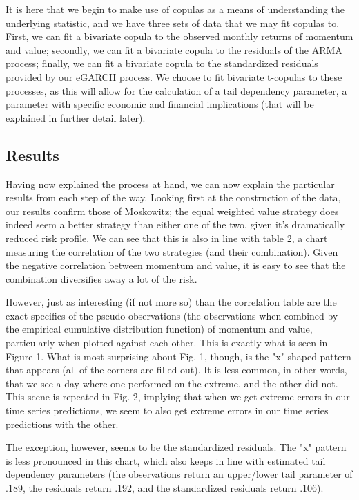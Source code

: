 \documentclass[12pt,letterpaper]{memoir}
\begin{document}
It is here that we begin to make use of copulas as a means of understanding the underlying statistic, and we have three sets of data that we may fit copulas to. First, we can fit a bivariate copula to the observed monthly returns of momentum and value; secondly, we can fit a bivariate copula to the residuals of the ARMA process; finally, we can fit a bivariate copula to the standardized residuals provided by our eGARCH process. We choose to fit bivariate t-copulas to these processes, as this will allow for the calculation of a tail dependency parameter, a parameter with specific economic and financial implications (that will be explained in further detail later).
\subsection*{Results}
Having now explained the process at hand, we can now explain the particular results from each step of the way. Looking first at the construction of the data, our results confirm those of Moskowitz; the equal weighted value strategy does indeed seem a better strategy than either one of the two, given it's dramatically reduced risk profile. We can see that this is also in line with table 2, a chart measuring the correlation of the two strategies (and their combination). Given the negative correlation between momentum and value, it is easy to see that the combination diversifies away a lot of the risk.

However, just as interesting (if not more so) than the correlation table are the exact specifics of the pseudo-observations (the observations when combined by the empirical cumulative distribution function) of momentum and value, particularly when plotted against each other. This is exactly what is seen in Figure 1. What is most surprising about Fig. 1, though, is the "x" shaped pattern that appears (all of the corners are filled out). It is less common, in other words, that we see a day where one performed on the extreme, and the other did not. This scene is repeated in Fig. 2, implying that when we get extreme errors in our time series predictions, we seem to also get extreme errors in our time series predictions with the other.

The exception, however, seems to be the standardized residuals. The "x" pattern is less pronounced in this chart, which also keeps in line with estimated tail dependency parameters (the observations return an upper/lower tail parameter of .189, the residuals return .192, and the standardized residuals return .106).
\end{document}
